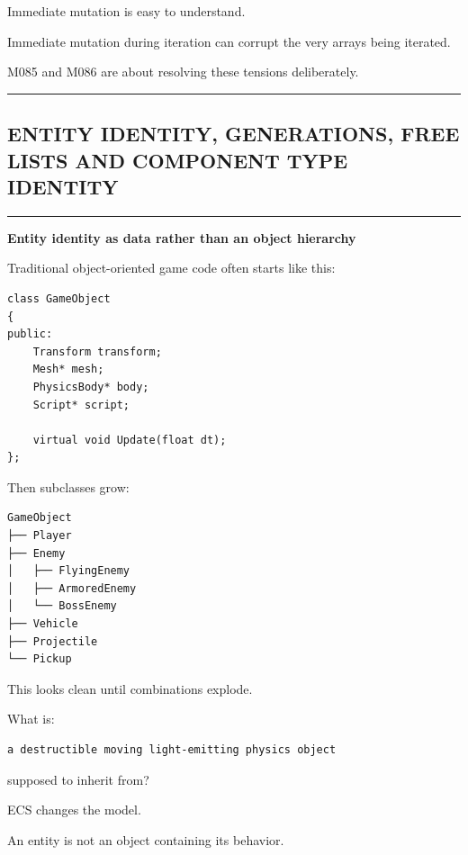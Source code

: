 Immediate mutation is easy to understand.

Immediate mutation during iteration can corrupt the very arrays being iterated.

M085 and M086 are about resolving these tensions deliberately.

\begin{center}\rule{0.5\linewidth}{0.5pt}\end{center}

\subsection{ENTITY IDENTITY, GENERATIONS, FREE LISTS AND COMPONENT TYPE IDENTITY}\label{05-engine-i-ch014-entity-identity-generations-free-lists-and-component-type-identity}

\hypertarget{05-engine-i-ch014-entity-identity-generations-free-lists-and-component-type-identity}{}

\begin{center}\rule{0.5\linewidth}{0.5pt}\end{center}

\textbf{Entity identity as data rather than an object hierarchy}

Traditional object-oriented game code often starts like this:

\begin{verbatim}
class GameObject
{
public:
    Transform transform;
    Mesh* mesh;
    PhysicsBody* body;
    Script* script;

    virtual void Update(float dt);
};
\end{verbatim}

Then subclasses grow:

\begin{verbatim}
GameObject
├── Player
├── Enemy
│   ├── FlyingEnemy
│   ├── ArmoredEnemy
│   └── BossEnemy
├── Vehicle
├── Projectile
└── Pickup
\end{verbatim}

This looks clean until combinations explode.

What is:

\begin{verbatim}
a destructible moving light-emitting physics object
\end{verbatim}

supposed to inherit from?

ECS changes the model.

An entity is not an object containing its behavior.

